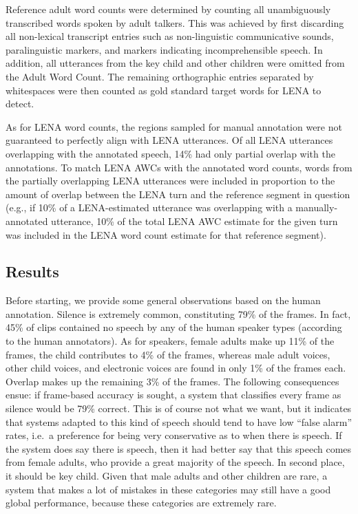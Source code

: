 \documentclass[english,floatsintext,man]{apa6}
\begin{document}
Reference adult word counts were determined by counting all
unambiguously transcribed words spoken by adult talkers. This was
achieved by first discarding all non-lexical transcript entries such as
non-linguistic communicative sounds, paralinguistic markers, and markers
indicating incomprehensible speech. In addition, all utterances from the
key child and other children were omitted from the Adult Word Count. The
remaining orthographic entries separated by whitespaces were then
counted as gold standard target words for LENA to detect.

As for LENA word counts, the regions sampled for manual annotation were
not guaranteed to perfectly align with LENA utterances. Of all LENA
utterances overlapping with the annotated speech, 14\% had only partial
overlap with the annotations. To match LENA AWCs with the annotated word
counts, words from the partially overlapping LENA utterances were
included in proportion to the amount of overlap between the LENA turn
and the reference segment in question (e.g., if 10\% of a LENA-estimated
utterance was overlapping with a manually-annotated utterance, 10\% of
the total LENA AWC estimate for the given turn was included in the LENA
word count estimate for that reference segment).

\subsection{Results}\label{results}

Before starting, we provide some general observations based on the human
annotation. Silence is extremely common, constituting 79\% of the
frames. In fact, 45\% of clips contained no speech by any of the human
speaker types (according to the human annotators). As for speakers,
female adults make up 11\% of the frames, the child contributes to 4\%
of the frames, whereas male adult voices, other child voices, and
electronic voices are found in only 1\% of the frames each. Overlap
makes up the remaining 3\% of the frames. The following consequences
ensue: if frame-based accuracy is sought, a system that classifies every
frame as silence would be 79\% correct. This is of course not what we
want, but it indicates that systems adapted to this kind of speech
should tend to have low \enquote{false alarm} rates, i.e.~a preference
for being very conservative as to when there is speech. If the system
does say there is speech, then it had better say that this speech comes
from female adults, who provide a great majority of the speech. In
second place, it should be key child. Given that male adults and other
children are rare, a system that makes a lot of mistakes in these
categories may still have a good global performance, because these
categories are extremely rare.
\end{document}
